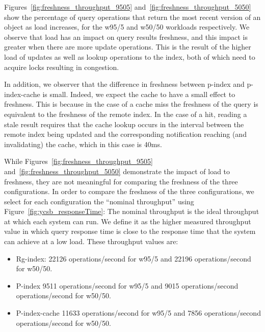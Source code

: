 Figures~\ref{fig:freshness_throughput_9505} and~\ref{fig:freshness_throughput_5050} show
the percentage of query operations that return the most recent version of an object as load increases,
for the w95/5 and w50/50 workloads respectively.
We observe that load has an impact on query results freshness,
and this impact is greater when there are more update operations.
This is the result of the higher load of updates as well as lookup operations to the index, both of which need to acquire
locks resulting in congestion.

In addition, we observer that the difference in freshness between p-index and p-index-cache is small.
Indeed, we expect the cache to have a small effect to freshness.
This is because in the case of a cache miss the freshness of the query is equivalent to the freshness of the remote index.
In the case of a hit, reading a stale result requires that the cache lookup occurs in the interval between the remote
index being updated and the corresponding notification reaching (and invalidating) the cache, which in this case is 40ms.

\bigskip
\noindent
While Figures~\ref{fig:freshness_throughput_9505} and~\ref{fig:freshness_throughput_5050} demonstrate the impact of
load to freshness, they are not meaningful for comparing the freshness of the three configurations.
In order to compare the freshness of the three configurations,
we select for each configuration the ``nominal throughput'' using Figure~\ref{fig:ycsb_responseTime}:
The nominal throughput is the ideal throughput at which each system can run.
We define it as the higher measured throughput value in which query response
time is close to the response time that the system can achieve at a low load.
These throughput values are:
\begin{itemize}
  \item Rg-index: 22126 operations/second for w95/5 and 22196 operations/second for w50/50.
  \item P-index 9511 operations/second for w95/5 and 9015 operations/second operations/second for w50/50.
  \item P-index-cache 11633 operations/second for w95/5 and 7856 operations/second operations/second for w50/50.
\end{itemize}


